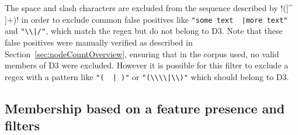 \begin{description}
The space and slash characters are excluded from the sequence described by \cverb!([^ \\]+)! in order to exclude common false positives like \verb!"some text  |more text"! and \verb!"\\|/"!, which match the regex but do not belong to D3.  Note that these false positives were manually verified as described in Section~\ref{sec:nodeCountOverview}, ensuring that in the corpus used, no valid members of D3 were excluded.  However it is possible for this filter to exclude a regex with a pattern like \verb!"(  | )"! or \verb!"(\\\\|\\)"! which should belong to D3.
\end{description}

\subsection{Membership based on a feature presence and filters}
